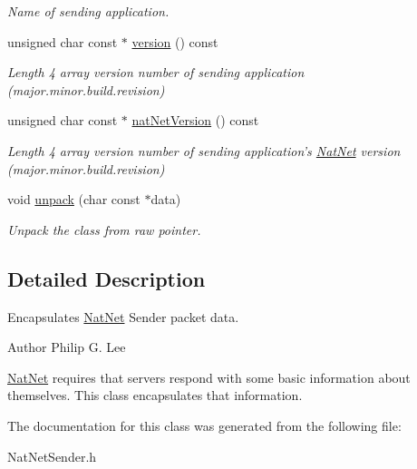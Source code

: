 \begin{DoxyCompactItemize}
\begin{DoxyCompactList}\small\item\em \-Name of sending application. \end{DoxyCompactList}\item 
\hypertarget{classNatNetSender_a20830ec0fdeb40ce2eb2dc8cd7b7d7be}{unsigned char const $\ast$ \hyperlink{classNatNetSender_a20830ec0fdeb40ce2eb2dc8cd7b7d7be}{version} () const }\label{classNatNetSender_a20830ec0fdeb40ce2eb2dc8cd7b7d7be}

\begin{DoxyCompactList}\small\item\em \-Length 4 array version number of sending application (major.\-minor.\-build.\-revision) \end{DoxyCompactList}\item 
\hypertarget{classNatNetSender_a89bfa0c1137ad221c54be093a0966088}{unsigned char const $\ast$ \hyperlink{classNatNetSender_a89bfa0c1137ad221c54be093a0966088}{nat\-Net\-Version} () const }\label{classNatNetSender_a89bfa0c1137ad221c54be093a0966088}

\begin{DoxyCompactList}\small\item\em \-Length 4 array version number of sending application's \hyperlink{classNatNet}{\-Nat\-Net} version (major.\-minor.\-build.\-revision) \end{DoxyCompactList}\item 
\hypertarget{classNatNetSender_a489b46fd15a4274fcd9ddf7ea80f5fb8}{void \hyperlink{classNatNetSender_a489b46fd15a4274fcd9ddf7ea80f5fb8}{unpack} (char const $\ast$data)}\label{classNatNetSender_a489b46fd15a4274fcd9ddf7ea80f5fb8}

\begin{DoxyCompactList}\small\item\em \-Unpack the class from raw pointer. \end{DoxyCompactList}\end{DoxyCompactItemize}


\subsection{\-Detailed \-Description}
\-Encapsulates \hyperlink{classNatNet}{\-Nat\-Net} \-Sender packet data. 

\begin{DoxyAuthor}{\-Author}
\-Philip \-G. \-Lee
\end{DoxyAuthor}
\hyperlink{classNatNet}{\-Nat\-Net} requires that servers respond with some basic information about themselves. \-This class encapsulates that information. 

\-The documentation for this class was generated from the following file\-:\begin{DoxyCompactItemize}
\item 
\-Nat\-Net\-Sender.\-h\end{DoxyCompactItemize}
